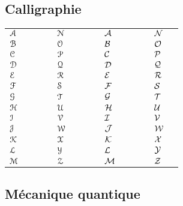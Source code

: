 \documentclass{article}
\begin{document}
\subsection{Calligraphie}

\begin{table}[H]
    \centering
    \begin{tabular}{ll ll ll ll ll ll ll}
    $\EuScript{A}$ & \raw{\cala} &&& $\EuScript{N}$ & \raw{\caln} &&& $\mathcal{A}$ & \raw{\mcala} &&& $\mathcal{N}$ & \raw{\mcaln}\\
    $\EuScript{B}$ & \raw{\calb} &&& $\EuScript{O}$ & \raw{\calo} &&& $\mathcal{B}$ & \raw{\mcalb} &&& $\mathcal{O}$ & \raw{\mcalo}\\
    $\EuScript{C}$ & \raw{\calc} &&& $\EuScript{P}$ & \raw{\calp} &&& $\mathcal{C}$ & \raw{\mcalc} &&& $\mathcal{P}$ & \raw{\mcalp}\\
    $\EuScript{D}$ & \raw{\cald} &&& $\EuScript{Q}$ & \raw{\calq} &&& $\mathcal{D}$ & \raw{\mcald} &&& $\mathcal{Q}$ & \raw{\mcalq}\\
    $\EuScript{E}$ & \raw{\cale} &&& $\EuScript{R}$ & \raw{\calr} &&& $\mathcal{E}$ & \raw{\mcale} &&& $\mathcal{R}$ & \raw{\mcalr}\\
    $\EuScript{F}$ & \raw{\calf} &&& $\EuScript{S}$ & \raw{\cals} &&& $\mathcal{F}$ & \raw{\mcalf} &&& $\mathcal{S}$ & \raw{\mcals}\\
    $\EuScript{G}$ & \raw{\calg} &&& $\EuScript{T}$ & \raw{\calt} &&& $\mathcal{G}$ & \raw{\mcalg} &&& $\mathcal{T}$ & \raw{\mcalt}\\
    $\EuScript{H}$ & \raw{\calh} &&& $\EuScript{U}$ & \raw{\calu} &&& $\mathcal{H}$ & \raw{\mcalh} &&& $\mathcal{U}$ & \raw{\mcalu}\\
    $\EuScript{I}$ & \raw{\cali} &&& $\EuScript{V}$ & \raw{\calv} &&& $\mathcal{I}$ & \raw{\mcali} &&& $\mathcal{V}$ & \raw{\mcalv}\\
    $\EuScript{J}$ & \raw{\calj} &&& $\EuScript{W}$ & \raw{\calw} &&& $\mathcal{J}$ & \raw{\mcalj} &&& $\mathcal{W}$ & \raw{\mcalw}\\
    $\EuScript{K}$ & \raw{\calk} &&& $\EuScript{X}$ & \raw{\calx} &&& $\mathcal{K}$ & \raw{\mcalk} &&& $\mathcal{X}$ & \raw{\mcalx}\\
    $\EuScript{L}$ & \raw{\call} &&& $\EuScript{Y}$ & \raw{\caly} &&& $\mathcal{L}$ & \raw{\mcall} &&& $\mathcal{Y}$ & \raw{\mcaly}\\
    $\EuScript{M}$ & \raw{\calm} &&& $\EuScript{Z}$ & \raw{\calz} &&& $\mathcal{M}$ & \raw{\mcalm} &&& $\mathcal{Z}$ & \raw{\mcalz}
    \end{tabular}
\end{table}

\subsection{Mécanique quantique}
\end{document}
